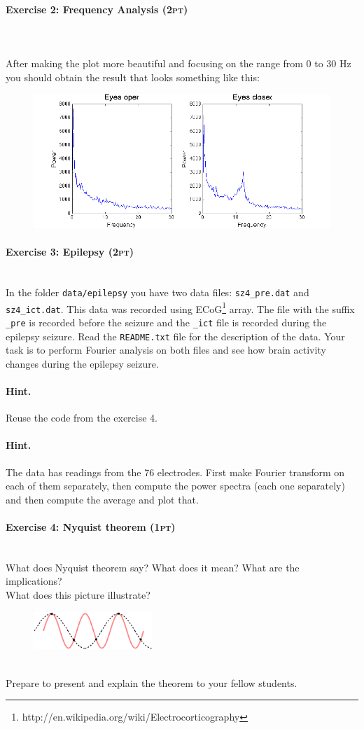 \documentclass[a4paper,11pt]{article}
\newenvironment{exercise}[3]{\paragraph{Exercise #1: #2 \textsc{(#3pt)}}\ \\}{
\medskip}
\begin{document}
\begin{exercise}{2}{Frequency Analysis}{2}
\ \\
After making the plot more beautiful and focusing on the range from 0 to 30 Hz you should obtain the result that looks something like this:
\begin{figure}[H]
   \centering
   \includegraphics[width=1\textwidth]{fouriereyes.png} 
\end{figure}
\end{exercise}


%
%
\begin{exercise}{3}{Epilepsy}{2}
In the folder \texttt{data/epilepsy} you have two data files: \texttt{sz4\_pre.dat} and \texttt{sz4\_ict.dat}. This data was recorded using ECoG\footnote{http://en.wikipedia.org/wiki/Electrocorticography} array. The file with the suffix \texttt{\_pre} is recorded before the seizure and the \texttt{\_ict} file is recorded during the epilepsy seizure. Read the \texttt{README.txt} file for the description of the data. Your task is to perform Fourier analysis on both files and see how brain activity changes during the epilepsy seizure.
\paragraph{Hint.} Reuse the code from the exercise 4.
\paragraph{Hint.} The data has readings from the 76 electrodes. First make Fourier transform on each of them separately, then compute the power spectra (each one separately) and then compute the average and plot that.
\end{exercise}



%
%
\begin{exercise}{4}{Nyquist theorem}{1}
What does Nyquist theorem say? What does it mean? What are the implications?\\
What does this picture illustrate?
\begin{figure}[H]
   \includegraphics[width=0.4\textwidth]{nyquist.png} 
\end{figure}
\ \\
Prepare to present and explain the theorem to your fellow students.
\end{exercise}
\end{document}
